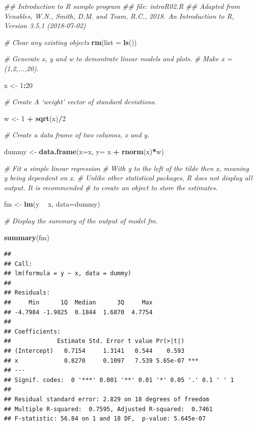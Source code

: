 \documentclass[]{book}
\newenvironment{Shaded}{\begin{snugshade}}{\end{snugshade}}
\newcommand{\CommentTok}[1]{\textcolor[rgb]{0.56,0.35,0.01}{\textit{#1}}}
\newcommand{\DataTypeTok}[1]{\textcolor[rgb]{0.13,0.29,0.53}{#1}}
\newcommand{\DecValTok}[1]{\textcolor[rgb]{0.00,0.00,0.81}{#1}}
\newcommand{\KeywordTok}[1]{\textcolor[rgb]{0.13,0.29,0.53}{\textbf{#1}}}
\newcommand{\NormalTok}[1]{#1}
\newcommand{\OperatorTok}[1]{\textcolor[rgb]{0.81,0.36,0.00}{\textbf{#1}}}
\newcommand{\StringTok}[1]{\textcolor[rgb]{0.31,0.60,0.02}{#1}}
\begin{document}
\begin{Shaded}
\begin{Highlighting}[]
\CommentTok{## Introduction to R sample program }
\CommentTok{## file: introR02.R}
\CommentTok{## Adapted from Venables, W.N., Smith, D.M. and Team, R.C., 2018. An Introduction to R, Version 3.5.1 (2018-07-02)}


\CommentTok{# Clear any existing objects }
\KeywordTok{rm}\NormalTok{(}\DataTypeTok{list =} \KeywordTok{ls}\NormalTok{())}

\CommentTok{# Generate x, y and w to demontrate linear models and plots.}
\CommentTok{# Make x = (1,2,...,20).}

\NormalTok{x <-}\StringTok{ }\DecValTok{1}\OperatorTok{:}\DecValTok{20}

\CommentTok{# Create A ‘weight’ vector of standard deviations.}

\NormalTok{w <-}\StringTok{ }\DecValTok{1} \OperatorTok{+}\StringTok{ }\KeywordTok{sqrt}\NormalTok{(x)}\OperatorTok{/}\DecValTok{2}

\CommentTok{# Create a data frame of two columns, x and y.}

\NormalTok{dummy <-}\StringTok{ }\KeywordTok{data.frame}\NormalTok{(}\DataTypeTok{x=}\NormalTok{x, }\DataTypeTok{y=}\NormalTok{ x }\OperatorTok{+}\StringTok{ }\KeywordTok{rnorm}\NormalTok{(x)}\OperatorTok{*}\NormalTok{w)}

\CommentTok{# Fit a simple linear regression }
\CommentTok{# With y to the left of the tilde then x, meaning y being dependent on x.}
\CommentTok{# Unlike other statistical packages, R does not display all output.  It is recommended}
\CommentTok{# to create an object to store the estimates.}

\NormalTok{fm <-}\StringTok{ }\KeywordTok{lm}\NormalTok{(y }\OperatorTok{~}\StringTok{ }\NormalTok{x, }\DataTypeTok{data=}\NormalTok{dummy) }

\CommentTok{# Display the summary of the output of model fm.}

\KeywordTok{summary}\NormalTok{(fm)}
\end{Highlighting}
\end{Shaded}

\begin{verbatim}
## 
## Call:
## lm(formula = y ~ x, data = dummy)
## 
## Residuals:
##     Min      1Q  Median      3Q     Max 
## -4.7984 -1.9825  0.1844  1.6870  4.7754 
## 
## Coefficients:
##             Estimate Std. Error t value Pr(>|t|)    
## (Intercept)   0.7154     1.3141   0.544    0.593    
## x             0.8270     0.1097   7.539 5.65e-07 ***
## ---
## Signif. codes:  0 '***' 0.001 '**' 0.01 '*' 0.05 '.' 0.1 ' ' 1
## 
## Residual standard error: 2.829 on 18 degrees of freedom
## Multiple R-squared:  0.7595, Adjusted R-squared:  0.7461 
## F-statistic: 56.84 on 1 and 18 DF,  p-value: 5.645e-07
\end{verbatim}
\end{document}
